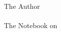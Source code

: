 \begin{titlepage}
  \raggedleft
  {\Large The Author\\ \pdfauthor\\[1in]}    
  {\large The Notebook on\\}
  {\Huge\scshape \bookname\\[.2in]}      
  {\large \bookoneword\\}    
  \vfill
  {\itshape \timeandcompany} 
\end{titlepage}

